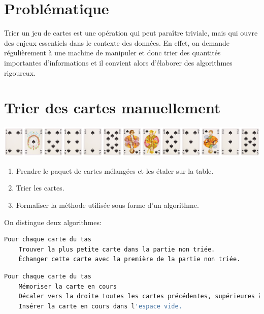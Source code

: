 \documentclass[a4paper,11pt]{article}
\begin{document}
\section{Problématique}
Trier un jeu de cartes est une opération qui peut paraître triviale, mais qui ouvre des enjeux essentiels dans le contexte des données. En effet, on demande régulièrement à une machine de manipuler et donc trier des quantités importantes d'informations et il convient alors d'élaborer des algorithmes rigoureux.
\begin{center}
\end{center}
\section{Trier des cartes manuellement}
\begin{center}
\centering
\includegraphics[width=17cm]{ressources/cartes-pique.png}
\label{pique}
\end{center}
\begin{activite}
\begin{enumerate}
    \item Prendre le paquet de cartes mélangées et les étaler sur la table.
    \item Trier les cartes.
    \item Formaliser la méthode utilisée sous forme d'un algorithme.
\end{enumerate}
\end{activite}
On distingue deux algorithmes:
\begin{center}
\begin{lstlisting}[language=bash]
Pour chaque carte du tas
    Trouver la plus petite carte dans la partie non triée.
    Échanger cette carte avec la première de la partie non triée.
\end{lstlisting}
\label{CODE}
\end{center}
\begin{center}
    \begin{lstlisting}[language=bash]
Pour chaque carte du tas
    Mémoriser la carte en cours
    Décaler vers la droite toutes les cartes précédentes, supérieures à la carte en cours.
    Insérer la carte en cours dans l'espace vide.
    \end{lstlisting}
    \label{CODE}
    \end{center}
\end{document}
